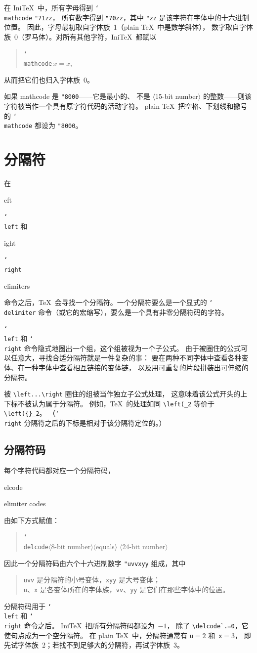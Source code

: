 \documentclass[a4paper]{rapport3}
\makeatletter
\def\nl{\protect\\}\def\n#1{{\tt #1}}\def\cs#1{{\tt\char`\\#1}}\let\csc\cs
\def\gr#1{$\langle$#1$\rangle$}\def\key#1{{\tt#1}}
\def\IniTeX{Ini\TeX}\def\LamsTeX{LAMS\TeX}\def\VirTeX{Vir\TeX}
\newenvironment{disp}{\begin{quotation}}{\end{quotation}}
\def\term#1\par{\index{#1}}
\def\cstoidx#1\par{\index{#1@\cs{#1}}}
\def\csidx#1{\cstoidx #1\par\cs{#1}}
\makeatother
\begin{document}
在 \IniTeX\ 中，所有字母得到 \cs{mathcode} \verb-"71zz-，
所有数字得到 \verb-"70zz-，其中 \verb-"zz- 是该字符在字体中的十六进制位置。
因此，字母最初取自字体族~1（plain \TeX\ 中是数学斜体），
数字取自字体族~0（罗马体）。对所有其他字符，\IniTeX\ 都赋以
\begin{disp}\cs{mathcode}$\,x=x$,\end{disp}
从而把它们也归入字体族~0。

如果 mathcode 是 \verb-"8000-\label{mcode:8000}——它是最小的、
不是 \gr{15-bit number} 的整数——则该字符被当作一个具有原字符代码的活动字符。
plain \TeX\ 把空格、下划线和撇号的 \cs{mathcode} 都设为 \verb-"8000-。


\section{分隔符}

在 \csidx{left} 和 \csidx{right}
\term delimiters\par
命令之后，\TeX\ 会寻找一个分隔符。一个分隔符要么是一个显式的
\cs{delimiter} 命令（或它的宏缩写），要么是一个具有非零分隔符码的字符。

\cs{left} 和 \cs{right} 命令隐式地圈出一个组，这个组被视为一个子公式。
由于被圈住的公式可以任意大，寻找合适分隔符就是一件复杂的事：
要在两种不同字体中查看各种变体、在一种字体中查看相互链接的变体链，
以及用可重复的片段拼装出可伸缩的分隔符。

被 \verb>\left...\right> 圈住的组被当作独立子公式处理，
这意味着该公式开头的上下标不被认为属于分隔符。
例如，\TeX\ 的处理如同 \verb>\left(_2> 等价于 \verb>\left({}_2>。
（\cs{right} 分隔符之后的下标是相对于该分隔符定位的。）

\subsection{分隔符码}
\label{delcodes}

每个字符代码都对应一个分隔符码，
\cstoidx delcode\par\term delimiter codes\par
由如下方式赋值：
\begin{disp}\cs{delcode}\gr{8-bit number}\gr{equals}%
          \gr{24-bit number}\end{disp}
因此一个分隔符码由六个十六进制数字 \verb-"uvvxyy- 组成，其中\begin{disp}
\n{uvv} 是分隔符的小号变体，\n{xyy} 是大号变体；\nl
\n u、\n x 是各变体所在的字体族，\n{vv}、\n{yy} 是它们在那些字体中的位置。\end{disp}
分隔符码用于 \cs{left} 和 \cs{right} 命令之后。
\IniTeX\ 把所有分隔符码都设为~$-1$，
除了\label{ini:del}
\verb-\delcode`.=0-，它使句点成为一个空分隔符。
在 plain \TeX\ 中，分隔符通常有 \n{u}${}=2$ 和~\n{x}${}=3$，
即先试字体族~2；若找不到足够大的分隔符，再试字体族~3。
\end{document}
